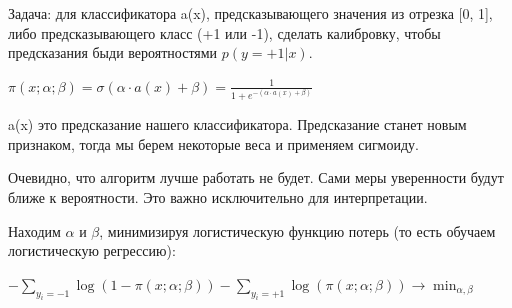 \documentclass{article}
\begin{document}
Задача: для классификатора a(x), предсказывающего значения из отрезка [0, 1], либо предсказывающего класс (+1 или -1), сделать калибровку, чтобы предсказания быди вероятностями $p(y=+1|x).$

$\pi(x ; \alpha ; \beta)=\sigma(\alpha \cdot a(x)+\beta)=\frac{1}{1+e^{-(\alpha \cdot a(x)+\beta)}}$

a(x) это предсказание нашего классификатора. Предсказание станет новым признаком, тогда мы берем некоторые веса и применяем сигмоиду.

Очевидно, что алгоритм лучше работать не будет. Сами меры уверенности будут ближе к вероятности. Это важно исключительно для интерпретации.

Находим $\alpha$ и $\beta$, минимизируя логистическую функцию потерь (то есть обучаем логистическую регрессию):

$-\sum_{y_{i}=-1} \log (1-\pi(x ; \alpha ; \beta))-\sum_{y_{i}=+1} \log (\pi(x ; \alpha ; \beta)) \rightarrow \min _{\alpha, \beta}$
\end{document}
